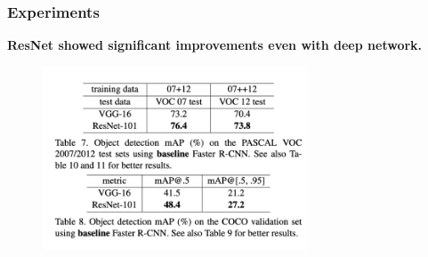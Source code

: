 \documentclass[
	11pt, %
]{beamer}
\begin{document}
\begin{frame}
	\frametitle{Experiments}

	\textbf{ResNet showed significant improvements even with deep network.}

	\begin{figure}
		\centering
		\includegraphics[width=0.7\textwidth]{./images/Screenshot 2025-05-20 at 0.44.13.png}
	\end{figure}
\end{frame}
\end{document}
